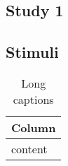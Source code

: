 \begin{appendices}
\chapter{Study 1}
\section{Stimuli}
\label{appendix:S1_stimuli}

\begin{table}[ht]
    \caption[Short Caption]{\label{table:A1_S1_stimuli} Long captions}
    \center
    \begin{adjustbox}{} %
    \begin{tabular}{l}
        \toprule
        \textbf{Column} \\
        \midrule
        content \\
        \bottomrule
    \end{tabular}
\end{adjustbox}
\end{table}

\end{appendices}